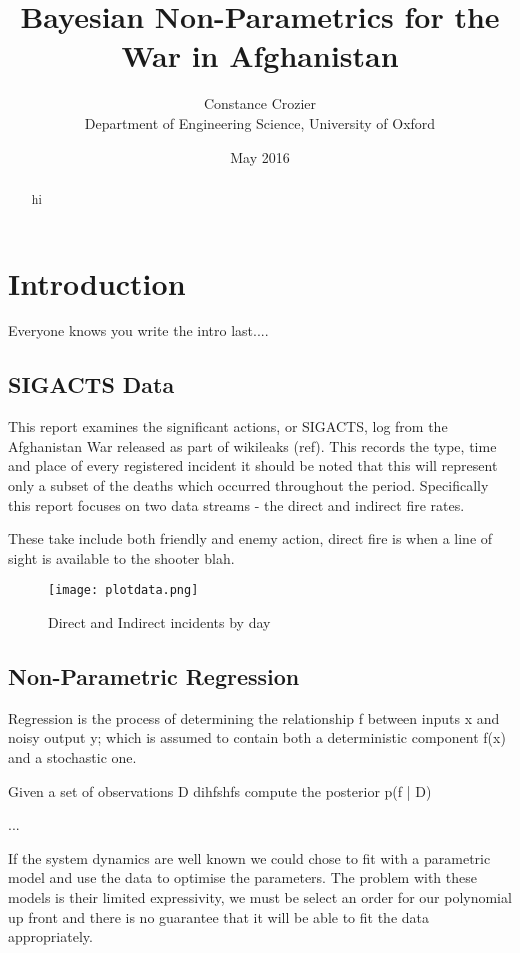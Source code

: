\documentclass[a4paper,11pt]{report}
\author{Constance Crozier\\Department of Engineering Science, University of Oxford}
\title{Bayesian Non-Parametrics for the War in Afghanistan}
\date{May 2016}
\begin{document}
\maketitle

\begin{abstract}
hi
\end{abstract}

\singlespacing
\pagestyle{plain}
\tableofcontents
\doublespacing

\pagebreak

\chapter{Introduction}
Everyone knows you write the intro last....



\section{SIGACTS Data}
This report examines the significant actions, or SIGACTS, log from the Afghanistan War released as part of wikileaks (ref). This records the type, time and place of every registered incident it should be noted that this will represent only a subset of the deaths which occurred throughout the period. Specifically this report focuses on two data streams - the direct and indirect fire rates. 

These take include both friendly and enemy action, direct fire is when a line of sight is available to the shooter blah.

\begin{figure}
\centering
\texttt{[image: plotdata.png]}
\caption{Direct and Indirect incidents by day}
\label{fig:sigactsdata}
\end{figure}

\section{Non-Parametric Regression}

Regression is the process of determining the relationship f between inputs x and noisy output y; which is assumed to contain both a deterministic component f(x) and a stochastic one.

Given a set of observations D dihfshfs compute the posterior p(f | D) 


...

If the system dynamics are well known we could chose to fit with a parametric model and use the data to optimise the parameters. The problem with these models is their limited expressivity, we must be select an order for our polynomial up front and there is no guarantee that it will be able to fit the data appropriately.
\end{document}

